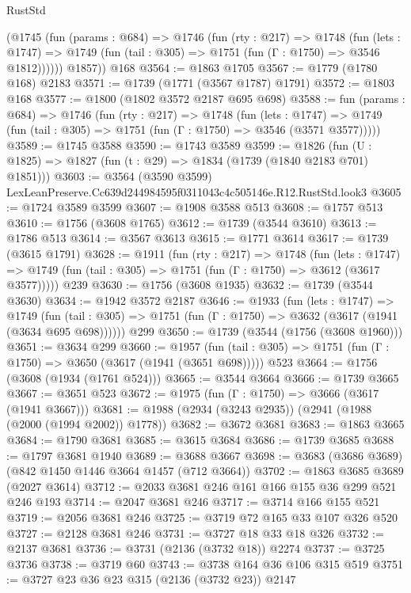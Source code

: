 \begin{lexlean}{RustStd}
\begin{coremodule}
        (@1745
          (fun (params : @684) =>
          @1746
            (fun (rty : @217) =>
            @1748
              (fun (lets : @1747) =>
              @1749 (fun (tail : @305) => @1751 (fun (Γ : @1750) => @3546 @1812))))))
        @1857))
    @168
@3564 := @1863 @1705
@3567 := @1779 (@1780 @168) @2183
@3571 := @1739 (@1771 (@3567 @1787) @1791)
@3572 := @1803 @168
@3577 := @1800 (@1802 @3572 @2187 @695 @698)
@3588 := fun (params : @684) =>
  @1746
    (fun (rty : @217) =>
    @1748
      (fun (lets : @1747) =>
      @1749 (fun (tail : @305) => @1751 (fun (Γ : @1750) => @3546 (@3571 @3577)))))
@3589 := @1745 @3588
@3590 := @1743 @3589
@3599 := @1826 (fun (U : @1825) => @1827 (fun (t : @29) => @1834 (@1739 (@1840 @2183 @701) @1851)))
@3603 := @3564 (@3590 @3599) LexLeanPreserve.Cc639d244984595f0311043c4c505146e.R12.RustStd.look3
@3605 := @1724 @3589 @3599
@3607 := @1908 @3588 @513
@3608 := @1757 @513
@3610 := @1756 (@3608 @1765)
@3612 := @1739 (@3544 @3610)
@3613 := @1786 @513
@3614 := @3567 @3613
@3615 := @1771 @3614
@3617 := @1739 (@3615 @1791)
@3628 := @1911
    (fun (rty : @217) =>
    @1748
      (fun (lets : @1747) =>
      @1749 (fun (tail : @305) => @1751 (fun (Γ : @1750) => @3612 (@3617 @3577)))))
    @239
@3630 := @1756 (@3608 @1935)
@3632 := @1739 (@3544 @3630)
@3634 := @1942 @3572 @2187
@3646 := @1933
    (fun (lets : @1747) =>
    @1749 (fun (tail : @305) => @1751 (fun (Γ : @1750) => @3632 (@3617 (@1941 (@3634 @695 @698))))))
    @299
@3650 := @1739 (@3544 (@1756 (@3608 @1960)))
@3651 := @3634 @299
@3660 := @1957
    (fun (tail : @305) => @1751 (fun (Γ : @1750) => @3650 (@3617 (@1941 (@3651 @698)))))
    @523
@3664 := @1756 (@3608 (@1934 (@1761 @524)))
@3665 := @3544 @3664
@3666 := @1739 @3665
@3667 := @3651 @523
@3672 := @1975 (fun (Γ : @1750) => @3666 (@3617 (@1941 @3667)))
@3681 := @1988 (@2934 (@3243 @2935)) (@2941 (@1988 (@2000 (@1994 @2002)) @1778))
@3682 := @3672 @3681
@3683 := @1863 @3665
@3684 := @1790 @3681
@3685 := @3615 @3684
@3686 := @1739 @3685
@3688 := @1797 @3681 @1940
@3689 := @3688 @3667
@3698 := @3683 (@3686 @3689) (@842 @1450 @1446 @3664 @1457 (@712 @3664))
@3702 := @1863 @3685 @3689 (@2027 @3614)
@3712 := @2033 @3681 @246 @161 @166 @155 @36 @299 @521 @246 @193
@3714 := @2047 @3681 @246
@3717 := @3714 @166 @155 @521
@3719 := @2056 @3681 @246
@3725 := @3719 @72 @165 @33 @107 @326 @520
@3727 := @2128 @3681 @246
@3731 := @3727 @18 @33 @18 @326
@3732 := @2137 @3681
@3736 := @3731 (@2136 (@3732 @18)) @2274
@3737 := @3725 @3736
@3738 := @3719 @60
@3743 := @3738 @164 @36 @106 @315 @519
@3751 := @3727 @23 @36 @23 @315 (@2136 (@3732 @23)) @2147

\end{coremodule}
\end{lexlean}

